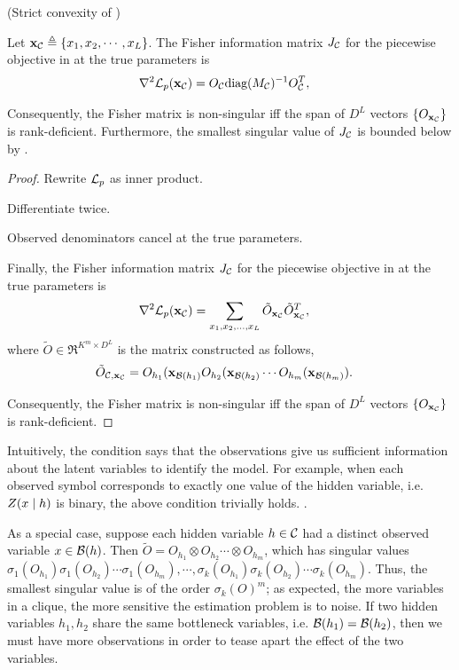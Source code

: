   \begin{lemma} (Strict convexity of )
  \label{lem:hessian}

  Let $\mathbf{x}_{\mathcal{C}} \triangleq\{x_1, x_2, \cdots, x_L\}$. The Fisher information
  matrix $J_{\mathcal{C}}$ for the piecewise objective in  at the
  true parameters is 
  \begin{align}
    \nabla^2 \mathcal{L}_p(\mathbf{x}_{\mathcal{C}}) 
    &= O_{\mathcal{C}} \textrm{diag}(M_{\mathcal{C}})^{-1} O_{\mathcal{C}}^T,
  \end{align}

  Consequently, the Fisher matrix is non-singular iff the span of $D^L$ vectors $\{ O_{\mathbf{x}_{\mathcal{C}}} \}$ is rank-deficient.
  Furthermore, the smallest singular value of $J_{\mathcal{C}}$ is bounded below
    by .
\end{lemma}
\begin{proof}
  Rewrite $\mathcal{L}_p$ as inner product.

  Differentiate twice.

  Observed denominators cancel at the true parameters.

  Finally, the Fisher information matrix $J_{\mathcal{C}}$ for the piecewise
  objective in  at the true parameters is 
  \begin{align}
    \nabla^2 \mathcal{L}_p(\mathbf{x}_{\mathcal{C}}) 
    &= \sum_{x_1, x_2, \ldots, x_L} \tilde O_{\mathbf{x}_{\mathcal{C}}} \tilde O_{\mathbf{x}_{\mathcal{C}}}^T,
  \end{align}
  where $\tilde O \in \Re^{K^m \times D^L}$ is the matrix constructed as follows,
  \begin{align}
    \tilde O_{\mathcal{C}, \mathbf{x}_{\mathcal{C}}} &= O_{h_1}(\mathbf{x}_{\mathcal{B}(h_1)} O_{h_2}(\mathbf{x}_{\mathcal{B}(h_2)} \cdots O_{h_m}(\mathbf{x}_{\mathcal{B}(h_m)}).
  \end{align}

  Consequently, the Fisher matrix is non-singular iff the span of $D^L$
    vectors $\{ O_{\mathbf{x}_{\mathcal{C}}} \}$ is rank-deficient.
\end{proof}

Intuitively, the condition  says that the observations give
  us sufficient information about the latent variables to identify the
  model. 
For example, when each observed symbol corresponds to exactly one value
  of the hidden variable, i.e. $Z(x \mid h )$ is binary, the above
  condition trivially holds\verify.
.

As a special case, suppose each hidden variable $h \in \mathcal{C}$ had
  a distinct observed variable $x \in \mathcal{B}(h)$. 
Then $\tilde O = O_{h_1} \otimes O_{h_2} \cdots \otimes O_{h_m}$, which
  has singular values $\sigma_1(O_{h_1}) \sigma_1(O_{h_2}) \cdots
  \sigma_1(O_{h_m}), \cdots, \sigma_k(O_{h_1}) \sigma_k(O_{h_2}) \cdots
  \sigma_k(O_{h_m})$. 
Thus, the smallest singular value is of the order $\sigma_k(O)^m$; as
  expected, the more variables in a clique, the more sensitive the
  estimation problem is to noise.
If two hidden variables $h_1, h_2$ share the same bottleneck
  variables, i.e. $\mathcal{B}(h_1) = \mathcal{B}(h_2)$, then we must have more
  observations in order to tease apart the effect of the two
  variables\verify\reword.


